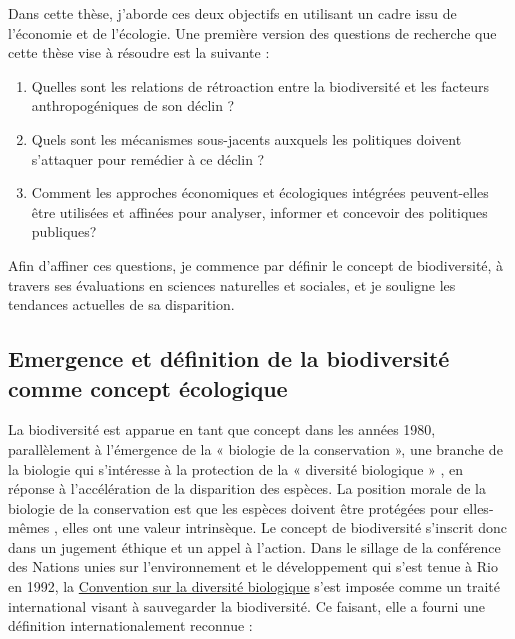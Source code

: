 \begin{displayquote}
\begin{displayquote}
\begin{displayquote}
{Dans cette thèse, j'aborde ces deux objectifs en utilisant un cadre issu de l'économie et de l'écologie. Une première version des questions de recherche que cette thèse vise à résoudre est la suivante : 

\begin{enumerate}
\item Quelles sont les relations de rétroaction entre la biodiversité et les facteurs anthropogéniques de son déclin ? 
\item Quels sont les mécanismes sous-jacents auxquels les politiques doivent s'attaquer pour remédier à ce déclin ?
\item Comment les approches économiques et écologiques intégrées peuvent-elles être utilisées et affinées pour analyser, informer et concevoir des politiques publiques? 
\end{enumerate}

Afin d'affiner ces questions, je commence par définir le concept de biodiversité, à travers ses évaluations en sciences naturelles et sociales, et je souligne les tendances actuelles de sa disparition.

{}
\subsection*{Emergence et définition de la biodiversité comme concept écologique }


La biodiversité est apparue en tant que concept dans les années 1980, parallèlement à l'émergence de la « biologie de la conservation », une branche de la biologie qui s'intéresse à la protection de la « diversité biologique » \citep{soule_what_1985}, en réponse à l'accélération de la disparition des espèces. La position morale de la biologie de la conservation est que les espèces doivent être protégées pour elles-mêmes \citep{soule_conservation_1986}, elles ont une valeur intrinsèque. 
Le concept de biodiversité s'inscrit donc dans un jugement éthique et un appel à l'action. Dans le sillage de la conférence des Nations unies sur l'environnement et le développement qui s'est tenue à Rio en 1992, la \href{https://www.cbd.int/}{Convention sur la diversité biologique} s'est imposée comme un traité international visant à sauvegarder la biodiversité. Ce faisant, elle a fourni une définition internationalement reconnue :

}
\end{displayquote}
\end{displayquote}
\end{displayquote}
